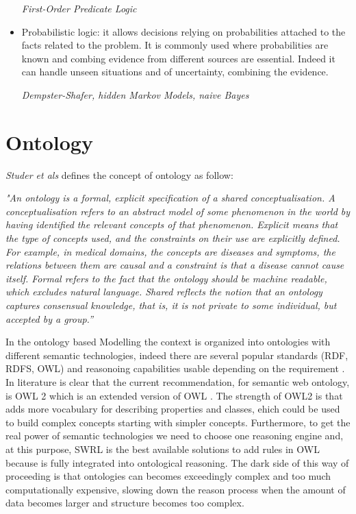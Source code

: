 \documentclass{thesisreport}
\begin{document}
\begin{itemize}
     \textit{First-Order Predicate Logic}
     
     \item Probabilistic logic: it allows decisions relying on probabilities attached to the facts related to the problem. It is commonly used where probabilities are known and combing evidence from different sources are essential. Indeed it can handle unseen situations and of uncertainty, combining the evidence.  
     
     \textit{Dempster-Shafer, hidden Markov Models, naive Bayes}
 \end{itemize}


\section{Ontology} \label{ontology}

\textit{Studer et als} \cite{studer1998knowledge} defines the concept of ontology as follow: 
\begin{center}
\textit{"An ontology is a formal, explicit specification of a shared conceptualisation. A conceptualisation refers to an abstract model of some phenomenon in the world by having identified the relevant concepts of that phenomenon. Explicit means that the type of concepts used, and the constraints on their use are explicitly defined. For example, in medical domains, the concepts are diseases and symptoms, the relations between them are causal and a constraint is that a disease cannot cause itself. Formal refers to the fact that the ontology should be machine readable, which excludes natural language. Shared reflects the notion that an ontology captures consensual knowledge, that is, it is not private to some individual, but accepted by a group.”}
\end{center}


In the ontology based Modelling the context is organized into ontologies with different semantic technologies, indeed there are several popular standards (RDF, RDFS, OWL) and reasonoing capabilities usable depending on the requirement \cite{perera2014context}. 
In literature is clear that the current recommendation, for semantic web ontology, is OWL 2 which is an extended version of OWL \cite{perera2014context}. The strength of OWL2 is that adds more vocabulary for describing properties and classes, ehich could be used to build complex concepts starting with simpler concepts.
Furthermore, to get the real power of semantic technologies we need to choose one reasoning engine and, at this purpose, SWRL is the best  available solutions to add rules in OWL because is fully integrated into ontological reasoning. The dark side of this way of proceeding is that ontologies can becomes exceedingly complex and too much computationally expensive, slowing down the reason process when the amount of data becomes larger and structure becomes too complex.
\end{document}
